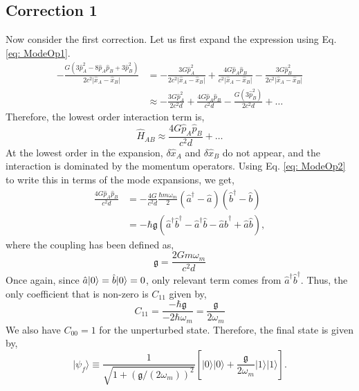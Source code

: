 \documentclass[12pt,a4paper]{report}
\theoremstyle{plain}
\theoremstyle{definition}
\theoremstyle{remark}
\renewcommand{\dag}{\dagger}
\newcommand{\Hab}{\hat{H}_{AB}}
\newcommand{\ahat}{\hat{a}}
\newcommand{\bhat}{\hat{b}}
\newcommand{\g}{\mathfrak{g}}
\DeclarePairedDelimiter\ket{\lvert}{\rangle}
\begin{document}
\subsection{Correction 1}
Now consider the first correction. Let us first expand the expression using Eq. \ref{eq: ModeOp1}.
\begin{equation}
   \begin{aligned}
        -\frac{G(3{\hat{p}}_{A}^{2}-8\hat{p}_{A}\hat{p}_{B}+3{\hat{p}}_{B}^{2})}{2c^{2}\vert{\hat{x}}_{A}-{\hat{x}}_{B}\vert} &=  -\frac{3G{\hat{p}}_{A}^{2}}{2c^{2}\vert{\hat{x}}_{A}-{\hat{x}}_{B}\vert} + \frac{4G\hat{p}_{A}\hat{p}_{B}}{c^{2}\vert{\hat{x}}_{A}-{\hat{x}}_{B}\vert} - \frac{3G{\hat{p}}_{B}^{2}}{2c^{2}\vert{\hat{x}}_{A}-{\hat{x}}_{B}\vert}\\
        &\approx -\frac{3G{\hat{p}}_{A}^{2}}{2c^{2}d} + \frac{4G\hat{p}_{A}\hat{p}_{B}}{c^{2}d} - \frac{G(3{\hat{p}}_{B}^{2})}{2c^{2}d} + \ldots
   \end{aligned} 
\end{equation}
Therefore, the lowest order interaction term is,
\begin{equation}
    \Hab  \approx \frac{4G\hat{p}_{A}\hat{p}_{B}}{c^{2}d} + \ldots
\end{equation}
At the lowest order in the expansion, $\delta\hat{x}_{A}$ and $\delta\hat{x}_{B}$ do not appear, and the interaction is dominated by the momentum operators. Using Eq. \ref{eq: ModeOp2} to write this in terms of the mode expansions, we get,
\begin{equation}
    \begin{aligned}
        \frac{4G\hat{p}_{A}\hat{p}_{B}}{c^{2}d} &= - \frac{4G}{c^{2}d} \frac{\hbar m \omega_m}{2}(\ahat^{\dag} - \ahat)(\bhat^{\dag} - \bhat) \\
        &= -\hbar\g(\ahat^{\dag}\bhat^{\dag} - \ahat^{\dag}\bhat - \ahat\bhat^{\dag} + \ahat\bhat),
    \end{aligned}
\end{equation}
where the coupling has been  defined as,
\begin{equation} \label{eq: CouplingNS1}
    \g = \frac{2Gm\omega_m}{c^2d}
\end{equation}
Once again, since $\ahat\ket{0} = \bhat\ket{0} = 0$, only relevant term comes from $\ahat^{\dag}\bhat^{\dag}$.
Thus, the only coefficient that is non-zero is $C_{11}$ given by,
\begin{equation}
    C_{11} = \frac{-\hbar\g}{-2\hbar\omega_m} = \frac{\g}{2\omega_m}
\end{equation}
We also have $C_{00} = 1$ for the unperturbed state. Therefore, the final state is given by,
\begin{equation} \label{eq: finalns1}
    \vert\psi_{f}\rangle\equiv\frac{1}{\sqrt{1+(\mathfrak{g}/(2\omega_{m}))^{2}}}[\vert0\rangle\vert0\rangle+\frac{\mathfrak{g}}{2\omega_{m}}\vert1\rangle\vert1\rangle].
\end{equation}
\end{document}
